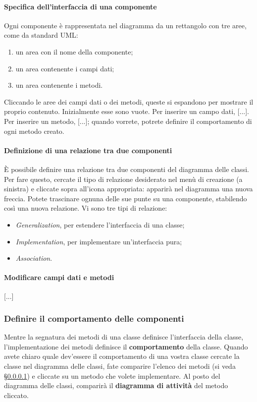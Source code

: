 \paragraph{Specifica dell'interfaccia di una componente} \label{par:inter} Ogni componente è rappresentata nel diagramma da un rettangolo con tre aree, come da standard UML:
\begin{enumerate}
	\item un area con il nome della componente;
	\item un area contenente i campi dati;
	\item un area contenente i metodi.
\end{enumerate}
Cliccando le aree dei campi dati o dei metodi, queste si espandono per mostrare il proprio contenuto. Inizialmente esse sono vuote. Per inserire un campo dati, [...]. Per inserire un metodo, [...]; quando vorrete, potrete definire il comportamento di ogni metodo creato.

\paragraph{Definizione di una relazione tra due componenti} È possibile definire una relazione tra due componenti del diagramma delle classi. Per fare questo, cercate il tipo di relazione desiderato nel menù di creazione (a sinistra) e cliccate sopra all'icona appropriata: apparirà nel diagramma una nuova freccia. Potete trascinare ognuna delle sue punte su una componente, stabilendo così una nuova relazione. Vi sono tre tipi di relazione:
\begin{itemize}
	\item \emph{Generalization}, per estendere l'interfaccia di una classe;
	\item \emph{Implementation}, per implementare un'interfaccia pura;
	\item \emph{Association}. %
\end{itemize}

\paragraph{Modificare campi dati e metodi} [...] %


\subsubsection{Definire il comportamento delle componenti} \label{sec:activity}
Mentre la segnatura dei metodi di una classe definisce l'interfaccia della classe, l'implementazione dei metodi definisce il \textbf{comportamento} della classe. Quando avete chiaro quale dev'essere il comportamento di una vostra classe cercate la classe nel diagramma delle classi, fate comparire l'elenco dei metodi (si veda §\ref{par:inter}) e cliccate su un metodo che volete implementare. Al posto del diagramma delle classi, comparirà il \textbf{diagramma di attività} del metodo cliccato.

